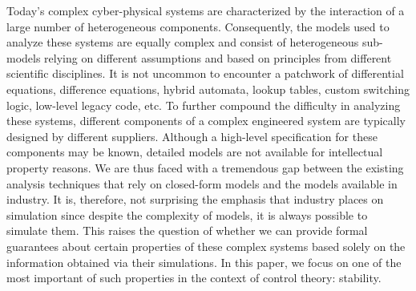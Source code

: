 Today's complex cyber-physical systems are characterized by the interaction of a large number of heterogeneous components. Consequently, the models used to analyze these systems are equally complex and consist of heterogeneous sub-models relying on different assumptions and based on principles from different scientific disciplines. It is not uncommon to encounter a patchwork of differential equations, difference equations, hybrid automata, lookup tables, custom switching logic, low-level legacy code, etc. To further compound the difficulty in analyzing these systems, different components of a complex engineered system are typically designed by different suppliers. Although a high-level specification for these components may be known, detailed models are not available for intellectual property reasons. We are thus faced with a tremendous gap between the existing analysis techniques that rely on closed-form models and the models available in industry. It is, therefore, not surprising the emphasis that industry places on simulation since despite the complexity of models, it is always possible to simulate them. This raises the question of whether we can provide formal guarantees about certain properties of these complex systems based solely on the information obtained via their simulations. In this paper, we focus on one of the most important of such properties in the context of control theory: stability.

